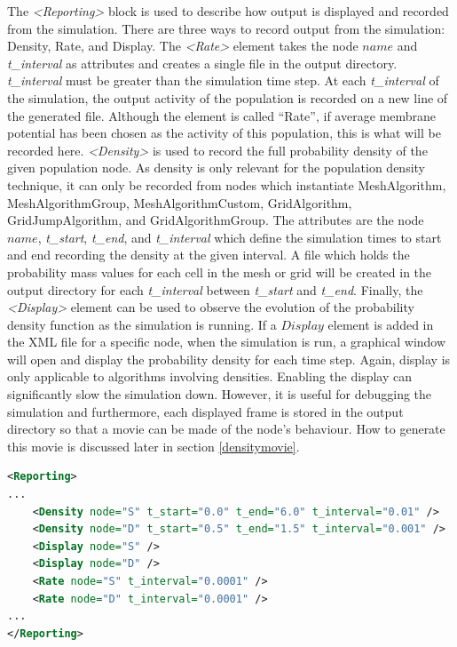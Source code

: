 \documentclass[utf8]{frontiersSCNS} %
\begin{document}
The \textit{\textless Reporting\textgreater} block is used to describe how output is displayed and recorded from the simulation. There are three ways to record output from the simulation: Density, Rate, and Display. The \textit{\textless Rate\textgreater} element takes the node $name$ and \textit{t\_interval} as attributes and creates a single file in the output directory. \textit{t\_interval} must be greater than the simulation time step. At each \textit{t\_interval} of the simulation, the output activity of the population is recorded on a new line of the generated file. Although the element is called ``Rate'', if average membrane potential has been chosen as the activity of this population, this is what will be recorded here. \textit{\textless Density\textgreater} is used to record the full probability density of the given population node. As density is only relevant for the population density technique, it can only be recorded from nodes which instantiate MeshAlgorithm, MeshAlgorithmGroup, MeshAlgorithmCustom, GridAlgorithm, GridJumpAlgorithm, and GridAlgorithmGroup. The attributes are the node $name$, \textit{t\_start}, \textit{t\_end}, and \textit{t\_interval} which define the simulation times to start and end recording the density at the given interval. A file which holds the probability mass values for each cell in the mesh or grid will be created in the output directory for each \textit{t\_interval} between \textit{t\_start} and \textit{t\_end}. Finally, the \textit{\textless Display\textgreater} element can be used to observe the evolution of the probability density function as the simulation is running. If a $Display$ element is added in the XML file for a specific node, when the simulation is run, a graphical window will open and display the probability density for each time step. Again, display is only applicable to algorithms involving densities. Enabling the display can significantly slow the simulation down. However, it is useful for debugging the simulation and furthermore, each displayed frame is stored in the output directory so that a movie can be made of the node’s behaviour. How to generate this movie is discussed later in section \ref{densitymovie}.

\begin{lstlisting}[language=xml]
<Reporting>
...
	<Density node="S" t_start="0.0" t_end="6.0" t_interval="0.01" />
	<Density node="D" t_start="0.5" t_end="1.5" t_interval="0.001" />
	<Display node="S" />
	<Display node="D" />
	<Rate node="S" t_interval="0.0001" />
	<Rate node="D" t_interval="0.0001" />
...
</Reporting>
\end{lstlisting}
\end{document}
